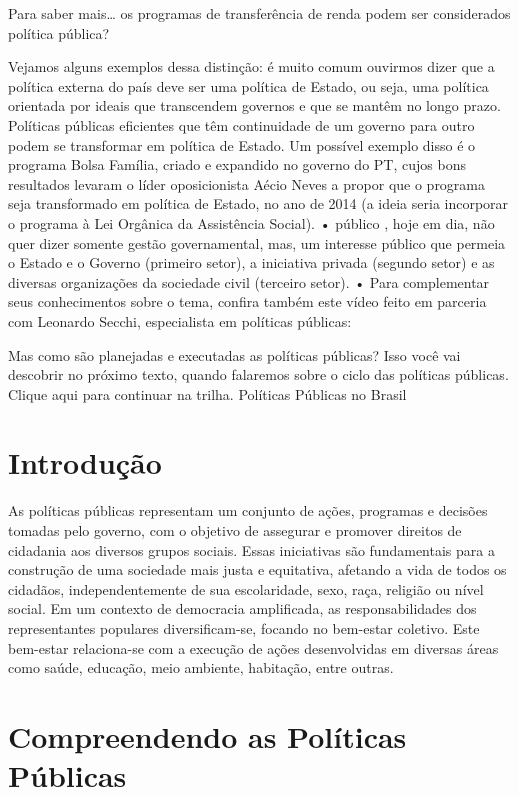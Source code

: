 \documentclass[
   article,       
   12pt,          
   oneside,       
   a4paper,       
   english,       
   brazil,        
   sumario=tradicional
   ]{abntex2}
\begin{document}
Para saber mais… os programas de transferência de renda podem ser considerados política pública?

Vejamos alguns exemplos dessa distinção: é muito comum ouvirmos dizer que a política externa do país deve ser uma política de Estado, ou seja, uma política orientada por ideais que transcendem governos e que se mantêm no longo prazo. Políticas públicas eficientes que têm continuidade de um governo para outro podem se transformar em política de Estado. Um possível exemplo disso é o programa Bolsa Família, criado e expandido no governo do PT, cujos bons resultados levaram o líder oposicionista Aécio Neves a propor que o programa seja transformado em política de Estado, no ano de 2014 (a ideia seria incorporar o programa à Lei Orgânica da Assistência Social).
• público , hoje em dia, não quer dizer somente gestão governamental, mas, um interesse público que permeia o Estado e o Governo (primeiro setor), a iniciativa privada (segundo setor) e as diversas organizações da sociedade civil (terceiro setor).
• Para complementar seus conhecimentos sobre o tema, confira também este vídeo feito em parceria com Leonardo Secchi, especialista em políticas públicas:

Mas como são planejadas e executadas as políticas públicas? Isso você vai descobrir no próximo texto, quando falaremos sobre o ciclo das políticas públicas. Clique aqui para continuar na trilha.
Políticas Públicas no Brasil

\section{Introdução}

As políticas públicas representam um conjunto de ações, programas e decisões tomadas pelo governo, com o objetivo de assegurar e promover direitos de cidadania aos diversos grupos sociais. Essas iniciativas são fundamentais para a construção de uma sociedade mais justa e equitativa, afetando a vida de todos os cidadãos, independentemente de sua escolaridade, sexo, raça, religião ou nível social. Em um contexto de democracia amplificada, as responsabilidades dos representantes populares diversificam-se, focando no bem-estar coletivo. Este bem-estar relaciona-se com a execução de ações desenvolvidas em diversas áreas como saúde, educação, meio ambiente, habitação, entre outras.

\section{Compreendendo as Políticas Públicas}
\end{document}

